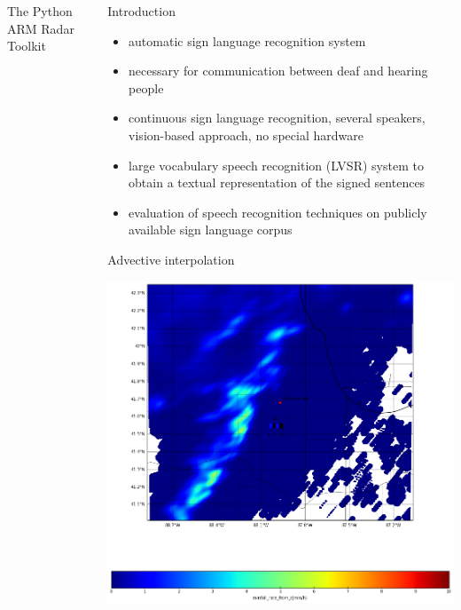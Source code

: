 \documentclass[final]{beamer}
\begin{document}
\begin{frame}{}
\begin{columns}[t]
\begin{column}{.3\linewidth}
         
        \begin{block}{The Python ARM Radar Toolkit}
        
         \end{block}
         

     

    \end{column}
      \begin{column}{.3\linewidth}
  \vfill
 
      \begin{block}{Introduction}
        \begin{itemize}
        \item automatic sign language recognition system                                    %
        \item \alert{necessary for communication} between deaf and
          hearing people
        \item \alert{continuous} sign language recognition,
          \alert{several} speakers, \alert{vision-based} approach, \alert{no
            special hardware}
        \item large vocabulary speech recognition (LVSR) system to
          obtain a textual representation of the signed
          sentences 
        \item evaluation of speech recognition techniques on \alert{publicly
          available sign language
          corpus}
        \end{itemize}
      \end{block}

 \begin{block}{Advective interpolation}

           \includegraphics[width=0.7\linewidth]{figures/aggregate.png}\\[1ex]                      
  

\end{block}
\end{column}
\end{columns}
\end{frame}
\end{document}
